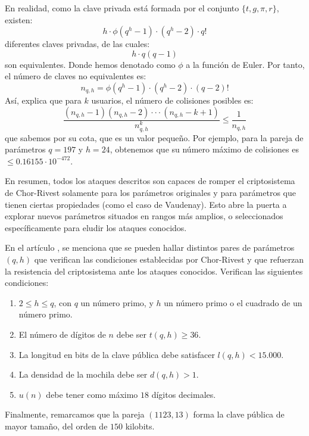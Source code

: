     En realidad, como la clave privada está formada por el conjunto $\{t, g, \pi, r\}$, existen:
    \begin{equation}
        h \cdot \phi(q^{h} - 1) \cdot (q^{h} - 2) \cdot q!
    \end{equation}
    diferentes claves privadas, de las cuales:
    \begin{equation}
        h \cdot q(q - 1)
    \end{equation}
    son equivalentes. Donde hemos denotado como $\phi$ a la función de Euler. Por tanto, el número de claves no equivalentes es:
    \begin{equation}
        n_{q,h} = \phi(q^{h} - 1) \cdot (q^{h} - 2) \cdot (q - 2)!
    \end{equation}
    Así, \cite{artQuanChorRivest} explica que para $k$ usuarios, el número de colisiones posibles es:
    \begin{equation}
        \frac{(n_{q,h} - 1)(n_{q,h} - 2) \cdot \cdot \cdot (n_{q,h} - k + 1)}{n^{k}_{q,h}} \leq \frac{1}{n_{q,h}}
    \end{equation}
    que sabemos por su cota, que es un valor pequeño. Por ejemplo, para la pareja de parámetros $q = 197$ y $h = 24$, obtenemos que su número máximo de colisiones es $\leq 0.16155 \cdot 10^{-472}$.

    En resumen, todos los ataques descritos son capaces de romper el criptosistema de Chor-Rivest solamente para los parámetros originales y para parámetros que tienen ciertas propiedades (como el caso de Vaudenay). Esto abre la puerta a explorar nuevos parámetros situados en rangos más amplios, o seleccionados específicamente para eludir los ataques conocidos.

    En el artículo \cite{artQuanChorRivest}, se menciona que se pueden hallar distintos pares de parámetros $(q, h)$ que verifican las condiciones establecidas por Chor-Rivest y que refuerzan la resistencia del criptosistema ante los ataques conocidos. Verifican las siguientes condiciones:
    \begin{enumerate}
        \item $2 \leq h \leq q$, con $q$ un número primo, y $h$ un número primo o el cuadrado de un número primo.
        \item El número de dígitos de $n$ debe ser $t(q, h) \geq 36$.
        \item La longitud en bits de la clave pública debe satisfacer $l(q, h) < 15.000$.
        \item La densidad de la mochila debe ser $d(q, h) > 1$.
        \item $u(n)$ debe tener como máximo $18$ dígitos decimales.
    \end{enumerate}
    Finalmente, remarcamos que la pareja $(1123, 13)$ forma la clave pública de mayor tamaño, del orden de $150$ kilobits.
    
\endinput
